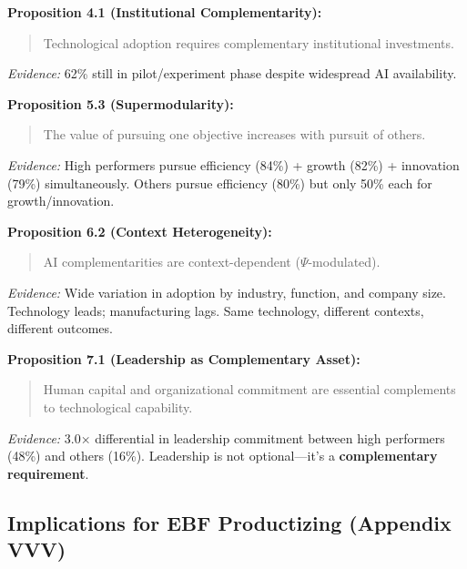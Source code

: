 \begin{tcolorbox}[colback=purple!5!white, colframe=purple!75!black,
    title=Empirical Support for EBF Propositions]

\textbf{Proposition 4.1 (Institutional Complementarity):}
\begin{quote}
Technological adoption requires complementary institutional investments.
\end{quote}
\textit{Evidence:} 62\% still in pilot/experiment phase despite widespread AI availability.

\vspace{0.5em}

\textbf{Proposition 5.3 (Supermodularity):}
\begin{quote}
The value of pursuing one objective increases with pursuit of others.
\end{quote}
\textit{Evidence:} High performers pursue efficiency (84\%) + growth (82\%) + innovation (79\%) simultaneously. Others pursue efficiency (80\%) but only 50\% each for growth/innovation.

\vspace{0.5em}

\textbf{Proposition 6.2 (Context Heterogeneity):}
\begin{quote}
AI complementarities are context-dependent ($\Psi$-modulated).
\end{quote}
\textit{Evidence:} Wide variation in adoption by industry, function, and company size. Technology leads; manufacturing lags. Same technology, different contexts, different outcomes.

\vspace{0.5em}

\textbf{Proposition 7.1 (Leadership as Complementary Asset):}
\begin{quote}
Human capital and organizational commitment are essential complements to technological capability.
\end{quote}
\textit{Evidence:} 3.0× differential in leadership commitment between high performers (48\%) and others (16\%). Leadership is not optional---it's a \textbf{complementary requirement}.

\end{tcolorbox}


\subsection{Implications for EBF Productizing (Appendix VVV)}

